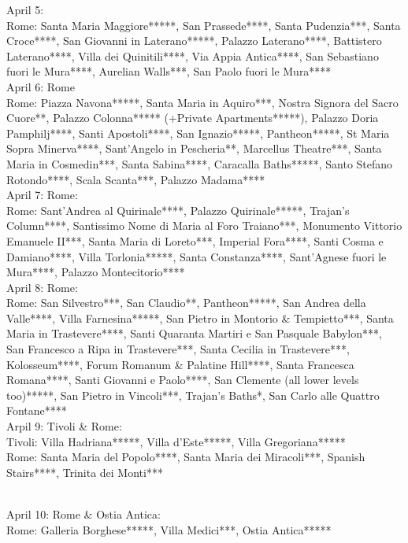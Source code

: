 April 5:\\
Rome: Santa Maria Maggiore*****, San Prassede****, Santa Pudenzia***, Santa Croce****, San Giovanni in Laterano*****, Palazzo Laterano****, Battistero Laterano****, Villa dei Quinitili****, Via Appia Antica****, San Sebastiano fuori le Mura****, Aurelian Walls***, San Paolo fuori le Mura****\\

April 6: Rome\\
Rome: Piazza Navona*****, Santa Maria in Aquiro***, Nostra Signora del Sacro Cuore**, Palazzo Colonna***** (+Private Apartments*****), Palazzo Doria Pamphilj****, Santi Apostoli****, San Ignazio*****, Pantheon*****, St Maria Sopra Minerva****, Sant'Angelo in Pescheria**, Marcellus Theatre***, Santa Maria in Cosmedin***, Santa Sabina****, Caracalla Baths*****, Santo Stefano Rotondo****, Scala Scanta***, Palazzo Madama****\\

April 7: Rome:\\
Rome: Sant'Andrea al Quirinale****, Palazzo Quirinale*****, Trajan's Column****, Santissimo Nome di Maria al Foro Traiano***, Monumento Vittorio Emanuele II***, Santa Maria di Loreto***, Imperial Fora****, Santi Cosma e Damiano****, Villa Torlonia*****,  Santa Constanza****, Sant'Agnese fuori le Mura****, Palazzo Montecitorio****\\

April 8: Rome:\\
Rome: San Silvestro***, San Claudio**, Pantheon*****, San Andrea della Valle****, Villa Farnesina*****, San Pietro in Montorio \& Tempietto***, Santa Maria in Trastevere****, Santi Quaranta Martiri e San Pasquale Babylon***, San Francesco a Ripa in Trastevere***, Santa Cecilia in Trastevere***, Kolosseum****, Forum Romanum \& Palatine Hill****, Santa Francesca Romana****, Santi Giovanni e Paolo****, San Clemente (all lower levels too)*****, San Pietro in Vincoli***, Trajan's Baths*, San Carlo alle Quattro Fontane****\\

Arpil 9: Tivoli \& Rome:\\
Tivoli: Villa Hadriana*****, Villa d'Este*****, Villa Gregoriana*****\\
Rome: Santa Maria del Popolo****, Santa Maria dei Miracoli***, Spanish Stairs****, Trinita dei Monti***\\\

April 10: Rome \& Ostia Antica:\\
Rome: Galleria Borghese*****, Villa Medici***, Ostia Antica*****\\

